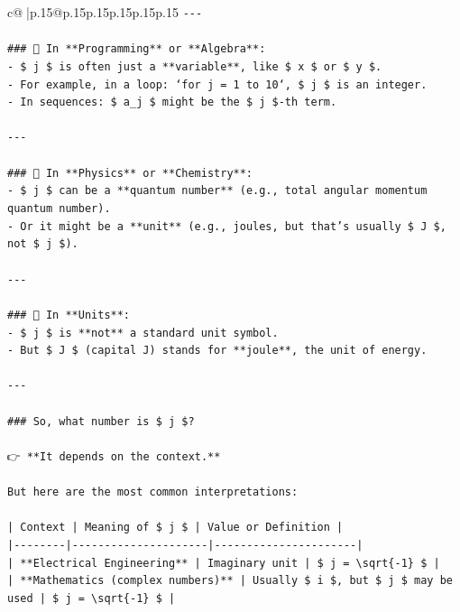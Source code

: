 \documentclass{article}
\begin{document}
{\begin{supertabular}{c@{$\;$}|p{.15\linewidth}@{}p{.15\linewidth}p{.15\linewidth}p{.15\linewidth}p{.15\linewidth}p{.15\linewidth}}
{{{\texttt{{-}{-}{-}} \\
\\ 
\texttt{\#\#\# 🔹 In **Programming** or **Algebra**:} \\
\texttt{{-} \$ j \$ is often just a **variable**, like \$ x \$ or \$ y \$.} \\
\texttt{{-} For example, in a loop: `for j = 1 to 10`, \$ j \$ is an integer.} \\
\texttt{{-} In sequences: \$ a\_j \$ might be the \$ j \${-}th term.} \\
\\ 
\texttt{{-}{-}{-}} \\
\\ 
\texttt{\#\#\# 🔹 In **Physics** or **Chemistry**:} \\
\texttt{{-} \$ j \$ can be a **quantum number** (e.g., total angular momentum quantum number).} \\
\texttt{{-} Or it might be a **unit** (e.g., joules, but that’s usually \$ J \$, not \$ j \$).} \\
\\ 
\texttt{{-}{-}{-}} \\
\\ 
\texttt{\#\#\# 🔹 In **Units**:} \\
\texttt{{-} \$ j \$ is **not** a standard unit symbol.} \\
\texttt{{-} But \$ J \$ (capital J) stands for **joule**, the unit of energy.} \\
\\ 
\texttt{{-}{-}{-}} \\
\\ 
\texttt{\#\#\# So, what number is \$ j \$?} \\
\\ 
\texttt{👉 **It depends on the context.**} \\
\\ 
\texttt{But here are the most common interpretations:} \\
\\ 
\texttt{| Context | Meaning of \$ j \$ | Value or Definition |} \\
\texttt{|{-}{-}{-}{-}{-}{-}{-}{-}|{-}{-}{-}{-}{-}{-}{-}{-}{-}{-}{-}{-}{-}{-}{-}{-}{-}{-}{-}{-}{-}|{-}{-}{-}{-}{-}{-}{-}{-}{-}{-}{-}{-}{-}{-}{-}{-}{-}{-}{-}{-}{-}{-}|} \\
\texttt{| **Electrical Engineering** | Imaginary unit | \$ j = \textbackslash{}sqrt\{{-}1\} \$ |} \\
\texttt{| **Mathematics (complex numbers)** | Usually \$ i \$, but \$ j \$ may be used | \$ j = \textbackslash{}sqrt\{{-}1\} \$ |} \\
}}}
\end{supertabular}}
\end{document}
